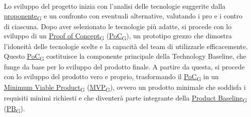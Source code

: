 \begin{flushleft}
	Lo sviluppo del progetto inizia con l'analisi delle tecnologie suggerite dalla \href{https://7last.github.io/docs/rtb/documentazione-interna/glossario\#proponente}{proponente\textsubscript{G}} e un confronto con eventuali alternative, valutando i pro e i contro di ciascuna. Dopo aver selezionato le tecnologie più adatte, si procede con lo sviluppo di un \href{https://7last.github.io/docs/rtb/documentazione-interna/glossario\#proof-of-concept}{Proof of Concept\textsubscript{G}} (\href{https://7last.github.io/docs/rtb/documentazione-interna/glossario\#proof-of-concept}{PoC\textsubscript{G}}), un prototipo grezzo che dimostra l'idoneità delle tecnologie scelte e la capacità del team di utilizzarle efficacemente. Questo \href{https://7last.github.io/docs/rtb/documentazione-interna/glossario\#proof-of-concept}{PoC\textsubscript{G}} costituisce la componente principale della Technology Baseline, che funge da base per lo sviluppo del prodotto finale. A partire da questa, si procede con lo sviluppo del prodotto vero e proprio, trasformando il \href{https://7last.github.io/docs/rtb/documentazione-interna/glossario\#proof-of-concept}{PoC\textsubscript{G}} in un \href{https://7last.github.io/docs/rtb/documentazione-interna/glossario\#minimum-viable-product}{Minimum Viable Product\textsubscript{G}} (\href{https://7last.github.io/docs/rtb/documentazione-interna/glossario\#minimum-viable-product}{MVP\textsubscript{G}}), ovvero un prodotto minimale che soddisfa i requisiti minimi richiesti e che diventerà parte integrante della \href{https://7last.github.io/docs/rtb/documentazione-interna/glossario\#product-baseline}{Product Baseline\textsubscript{G}} (\href{https://7last.github.io/docs/rtb/documentazione-interna/glossario\#product-baseline}{PB\textsubscript{G}}).
\end{flushleft}

